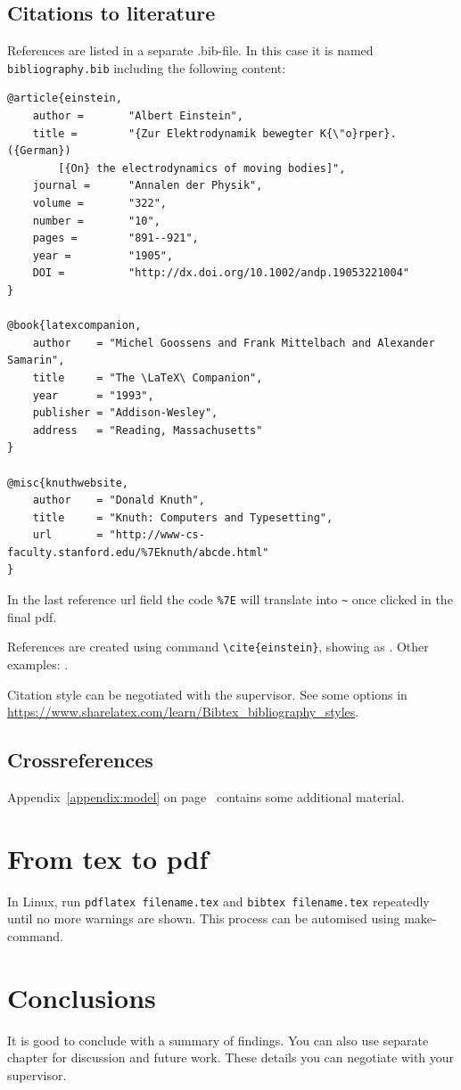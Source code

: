 \section{Citations to literature}

References are listed in a separate .bib-file. In this case it is named \texttt{bibliography.bib} including the following content:
\begin{verbatim}
@article{einstein,
    author =       "Albert Einstein",
    title =        "{Zur Elektrodynamik bewegter K{\"o}rper}. ({German})
        [{On} the electrodynamics of moving bodies]",
    journal =      "Annalen der Physik",
    volume =       "322",
    number =       "10",
    pages =        "891--921",
    year =         "1905",
    DOI =          "http://dx.doi.org/10.1002/andp.19053221004"
}
 
@book{latexcompanion,
    author    = "Michel Goossens and Frank Mittelbach and Alexander Samarin",
    title     = "The \LaTeX\ Companion",
    year      = "1993",
    publisher = "Addison-Wesley",
    address   = "Reading, Massachusetts"
}
 
@misc{knuthwebsite,
    author    = "Donald Knuth",
    title     = "Knuth: Computers and Typesetting",
    url       = "http://www-cs-faculty.stanford.edu/%7Eknuth/abcde.html"
}
\end{verbatim}

In the last reference url field the code \verb+%7E+ will translate into \verb+~+ once clicked in the final pdf.

References are created using command \texttt{\textbackslash cite\{einstein\}}, showing as \citep{einstein}. Other examples: \citep{latexcompanion,knuthwebsite}.

Citation style can be negotiated with the supervisor. See some options in \url{https://www.sharelatex.com/learn/Bibtex_bibliography_styles}.

\section{Crossreferences}

Appendix~\ref{appendix:model} on page~\pageref{appendix:model} contains some additional material.

\chapter{From tex to pdf}

In Linux, run \texttt{pdflatex filename.tex} and \texttt{bibtex filename.tex} repeatedly until no more warnings are shown. This process can be automised using make-command.
 
\chapter{Conclusions\label{chapter:conclusions}}

It is good to conclude with a summary of findings. You can also use separate chapter for discussion and future work. These details you can negotiate with your supervisor.